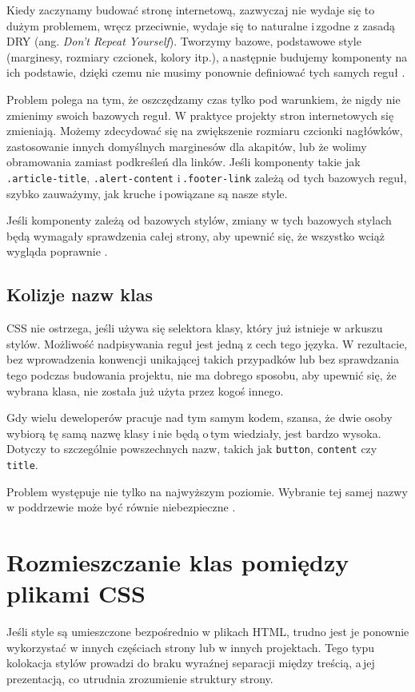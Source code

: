 \documentclass[a4paper,12pt]{book} %
\begin{document}
Kiedy zaczynamy budować stronę internetową, zazwyczaj nie wydaje się to dużym problemem, wręcz przeciwnie, wydaje się to naturalne i\,zgodne z zasadą DRY (ang. \emph{Don't Repeat Yourself}). Tworzymy bazowe, podstawowe style (marginesy, rozmiary czcionek, kolory itp.), a\,następnie budujemy komponenty na ich podstawie, dzięki czemu nie musimy ponownie definiować tych samych reguł \cite{SideEffects}.

Problem polega na tym, że oszczędzamy czas tylko pod warunkiem, że nigdy nie zmienimy swoich bazowych reguł. W praktyce projekty stron internetowych się zmieniają. Możemy zdecydować się na zwiększenie rozmiaru czcionki nagłówków, zastosowanie innych domyślnych marginesów dla akapitów, lub że wolimy obramowania zamiast podkreśleń dla linków. Jeśli komponenty takie jak \lstinline|.article-title|, \lstinline|.alert-content| i\,\lstinline|.footer-link| zależą od tych bazowych reguł, szybko zauważymy, jak kruche i\,powiązane są nasze style.

Jeśli komponenty zależą od bazowych stylów, zmiany w tych bazowych stylach będą wymagały sprawdzenia całej strony, aby upewnić się, że wszystko wciąż wygląda poprawnie \cite{SideEffects}.

\subsection{Kolizje nazw klas}


CSS nie ostrzega, jeśli używa się selektora klasy, który już istnieje w arkuszu stylów. Możliwość nadpisywania reguł jest jedną z cech tego języka. W rezultacie, bez wprowadzenia konwencji unikającej takich przypadków lub bez sprawdzania tego podczas budowania projektu, nie ma dobrego sposobu, aby upewnić się, że wybrana klasa, nie została już użyta przez kogoś innego.

Gdy wielu deweloperów pracuje nad tym samym kodem, szansa, że dwie osoby wybiorą tę samą nazwę klasy i\,nie będą o\,tym wiedziały, jest bardzo wysoka. Dotyczy to szczególnie powszechnych nazw, takich jak \lstinline|button|, \lstinline|content| czy \lstinline|title|.

Problem występuje nie tylko na najwyższym poziomie. Wybranie tej samej nazwy w poddrzewie może być równie niebezpieczne  \cite{SideEffects}.
\section{Rozmieszczanie klas pomiędzy plikami CSS}
Jeśli style są umieszczone bezpośrednio w plikach HTML, trudno jest je ponownie wykorzystać w innych częściach strony lub w innych projektach. Tego typu kolokacja stylów prowadzi do braku wyraźnej separacji między treścią, a\,jej prezentacją, co utrudnia zrozumienie struktury strony.
\end{document}
